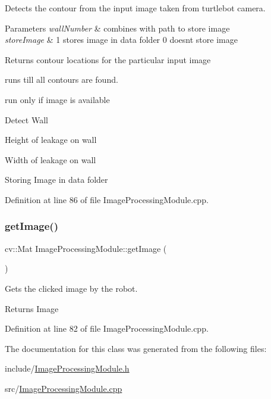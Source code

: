 Detects the contour from the input image taken from turtlebot camera. 


\begin{DoxyParams}{Parameters}
{\em wall\+Number} & combines with path to store image\\
\hline
{\em store\+Image} & 1 stores image in data folder 0 doesn\textquotesingle{}t store image\\
\hline
\end{DoxyParams}
\begin{DoxyReturn}{Returns}
contour locations for the particular input image 
\end{DoxyReturn}
runs till all contours are found.

run only if image is available

Detect Wall

Height of leakage on wall

Width of leakage on wall

Storing Image in data folder 

Definition at line 86 of file Image\+Processing\+Module.\+cpp.

\mbox{\label{class_image_processing_module_a445c2a3e209f7d7d757dc68beb9c0829}} 
\subsubsection{\texorpdfstring{get\+Image()}{getImage()}}
{\footnotesize\ttfamily cv\+::\+Mat Image\+Processing\+Module\+::get\+Image (\begin{DoxyParamCaption}{ }\end{DoxyParamCaption})}



Gets the clicked image by the robot. 

\begin{DoxyReturn}{Returns}
Image 
\end{DoxyReturn}


Definition at line 82 of file Image\+Processing\+Module.\+cpp.



The documentation for this class was generated from the following files\+:\begin{DoxyCompactItemize}
\item 
include/\mbox{\hyperlink{_image_processing_module_8h}{Image\+Processing\+Module.\+h}}\item 
src/\mbox{\hyperlink{_image_processing_module_8cpp}{Image\+Processing\+Module.\+cpp}}\end{DoxyCompactItemize}
